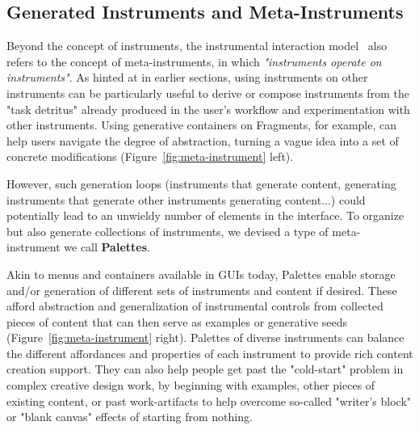 \subsection{Generated Instruments and Meta-Instruments}

Beyond the concept of instruments, the instrumental interaction model~\cite{beaudouin2000instrumental} also refers to the concept of meta-instruments, in which \textit{"instruments operate on instruments"}. 
As hinted at in earlier sections, using instruments on other instruments can be particularly useful to derive or compose instruments from the "task detritus" \cite{KirshIntelligentUseOfSpace1995} already produced in the user's workflow and experimentation with other instruments. Using generative containers on Fragments, for example, can help users navigate the degree of abstraction, turning a vague idea into a set of concrete modifications (Figure~\ref{fig:meta-instrument} left). 

However, such generation loops (instruments that generate content, generating instruments that generate other instruments generating content...) could potentially lead to an unwieldy number of elements in the interface. To organize but also generate collections of instruments, we devised a type of meta-instrument we call \textbf{Palettes}.

Akin to menus and containers available in GUIs today, Palettes enable storage and/or generation of different sets of instruments and content if desired. These afford abstraction and generalization of instrumental controls from collected pieces of content that can then serve as examples or generative seeds (Figure~\ref{fig:meta-instrument} right). Palettes of diverse instruments can balance the different affordances and properties of each instrument to provide rich content creation support. They can also help people get past the "cold-start" problem in complex creative design work, by beginning with examples, other pieces of existing content, or past work-artifacts to help overcome so-called "writer's block" or "blank canvas" effects of starting from nothing.



